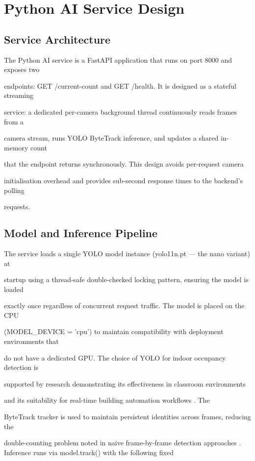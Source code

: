 \section{Python AI Service Design}

\subsection{Service Architecture}
The Python AI service is a FastAPI application that runs on port 8000 and exposes two

endpoints: GET /current-count and GET /health. It is designed as a stateful streaming

service: a dedicated per-camera background thread continuously reads frames from a

camera stream, runs YOLO ByteTrack inference, and updates a shared in-memory count

that the endpoint returns synchronously. This design avoids per-request camera

initialisation overhead and provides sub-second response times to the backend's polling

requests.


\subsection{Model and Inference Pipeline}
The service loads a single YOLO model instance (yolo11n.pt --- the nano variant) at

startup using a thread-safe double-checked locking pattern, ensuring the model is loaded

exactly once regardless of concurrent request traffic. The model is placed on the CPU

(MODEL\_DEVICE = 'cpu') to maintain compatibility with deployment environments that

do not have a dedicated GPU. The choice of YOLO for indoor occupancy detection is

supported by research demonstrating its eﬀectiveness in classroom environments \cite{choi2023}

and its suitability for real-time building automation workﬂows \cite{meng2023b}. The

ByteTrack tracker is used to maintain persistent identities across frames, reducing the

double-counting problem noted in naive frame-by-frame detection approaches
\cite{kumar2024,wu2024}. Inference runs via model.track() with the following fixed

